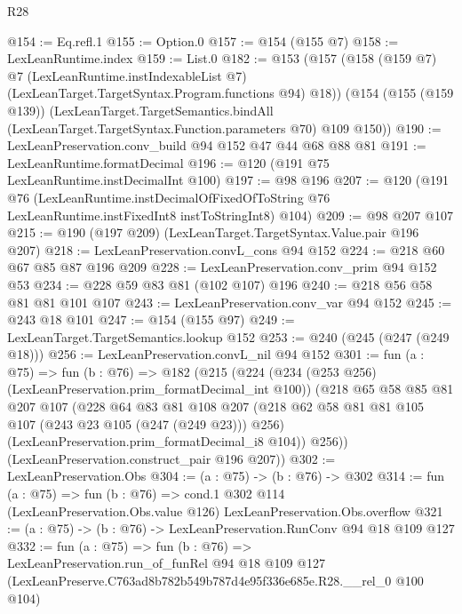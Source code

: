 \begin{lexlean}{R28}
\begin{coremodule}
@154 := Eq.refl.{1}
@155 := Option.{0}
@157 := @154 (@155 @7)
@158 := LexLeanRuntime.index
@159 := List.{0}
@182 := @153
    (@157
      (@158
        (@159 @7)
        @7
        (LexLeanRuntime.instIndexableList @7)
        (LexLeanTarget.TargetSyntax.Program.functions @94)
        @18))
    (@154
      (@155 (@159 @139))
      (LexLeanTarget.TargetSemantics.bindAll
        (LexLeanTarget.TargetSyntax.Function.parameters @70)
        @109
        @150))
@190 := LexLeanPreservation.conv_build @94 @152 @47 @44 @68 @88 @81
@191 := LexLeanRuntime.formatDecimal
@196 := @120 (@191 @75 LexLeanRuntime.instDecimalInt @100)
@197 := @98 @196
@207 := @120
    (@191
      @76
      (LexLeanRuntime.instDecimalOfFixedOfToString
        @76
        LexLeanRuntime.instFixedInt8
        instToStringInt8)
      @104)
@209 := @98 @207 @107
@215 := @190 (@197 @209) (LexLeanTarget.TargetSyntax.Value.pair @196 @207)
@218 := LexLeanPreservation.convL_cons @94 @152
@224 := @218 @60 @67 @85 @87 @196 @209
@228 := LexLeanPreservation.conv_prim @94 @152 @53
@234 := @228 @59 @83 @81 (@102 @107) @196
@240 := @218 @56 @58 @81 @81 @101 @107
@243 := LexLeanPreservation.conv_var @94 @152
@245 := @243 @18 @101
@247 := @154 (@155 @97)
@249 := LexLeanTarget.TargetSemantics.lookup @152
@253 := @240 (@245 (@247 (@249 @18)))
@256 := LexLeanPreservation.convL_nil @94 @152
@301 := fun (a : @75) =>
  fun (b : @76) =>
  @182
    (@215
      (@224
        (@234 (@253 @256) (LexLeanPreservation.prim_formatDecimal_int @100))
        (@218
          @65
          @58
          @85
          @81
          @207
          @107
          (@228
            @64
            @83
            @81
            @108
            @207
            (@218 @62 @58 @81 @81 @105 @107 (@243 @23 @105 (@247 (@249 @23))) @256)
            (LexLeanPreservation.prim_formatDecimal_i8 @104))
          @256))
      (LexLeanPreservation.construct_pair @196 @207))
@302 := LexLeanPreservation.Obs
@304 := (a : @75) -> (b : @76) -> @302
@314 := fun (a : @75) =>
  fun (b : @76) =>
  cond.{1} @302 @114 (LexLeanPreservation.Obs.value @126) LexLeanPreservation.Obs.overflow
@321 := (a : @75) -> (b : @76) -> LexLeanPreservation.RunConv @94 @18 @109 @127
@332 := fun (a : @75) =>
  fun (b : @76) =>
  LexLeanPreservation.run_of_funRel
    @94
    @18
    @109
    @127
    (LexLeanPreserve.C763ad8b782b549b787d4e95f336e685e.R28.__rel_0 @100 @104)
\end{coremodule}
\end{lexlean}
